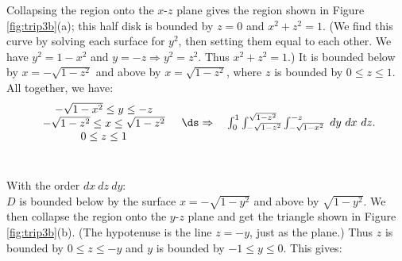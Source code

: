 {Collapsing the region onto the $x$-$z$ plane gives the region shown in Figure \ref{fig:trip3b}(a); this half disk is bounded by $z=0$ and $x^2+z^2=1$. (We find this curve by solving each surface for $y^2$, then setting them equal to each other. We have $y^2=1-x^2$ and $y=-z\Rightarrow y^2=z^2$. Thus $x^2+z^2=1$.) It is bounded below by $x=-\sqrt{1-z^2}$ and above by $x=\sqrt{1-z^2}$, where $z$ is bounded by $0\leq z\leq 1$. All together, we have:
$$\begin{array}{cc}
		\begin{array}{c}
		-\sqrt{1-x^2}\leq y\leq -z\\
		-\sqrt{1-z^2}\leq x\leq \sqrt{1-z^2}\\
		0\leq z\leq 1
		\end{array} 
		&
		\ds\Rightarrow \quad \int_{0}^1\int_{-\sqrt{1-z^2}}^{\sqrt{1-z^2}}\int_{-\sqrt{1-x^2}}^{-z}\ dy\ dx\ dz.
	\end{array}
$$\\

\noindent With the order $dx\ dz\ dy$:\\

$D$ is bounded below by the surface $x=-\sqrt{1-y^2}$ and above by $\sqrt{1-y^2}$. We then collapse the region onto the $y$-$z$ plane and get the triangle shown in Figure \ref{fig:trip3b}(b). (The hypotenuse is the line $z=-y$, just as the plane.) Thus $z$ is bounded by $0\leq z\leq -y$ and $y$ is bounded by $-1\leq y\leq 0$. This gives:

}
